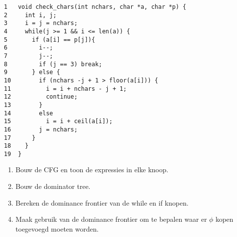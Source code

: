 \begin{lstlisting}
1   void check_chars(int nchars, char *a, char *p) {
2 	  int i, j;
3     i = j = nchars;
4     while(j >= 1 && i <= len(a)) {
5       if (a[i] == p[j]){
6         i--;
7         j--;
8         if (j == 3) break;
9       } else {
10        if (nchars -j + 1 > floor(a[i])) {
11          i = i + nchars - j + 1;
12          continue;
13        }
14        else
15          i = i + ceil(a[i]);
16        j = nchars;
17	    }
18	  }
19  }

\end{lstlisting}

\begin{enumerate}
	\item Bouw de CFG en toon de expressies in elke knoop.
	\item Bouw de dominator tree.
	\item Bereken de dominance frontier van de while en if knopen.
	\item Maak gebruik van de dominance frontier om te bepalen waar er $\phi$ kopen toegevoegd moeten worden.
\end{enumerate}